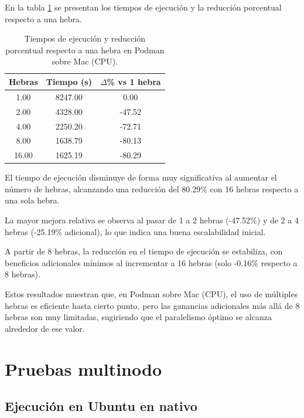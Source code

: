 En la tabla \ref{tab:single-node_mac_podman_time} se presentan los tiempos de ejecución y la reducción porcentual respecto a una hebra.

\begin{table}[ht]
    \centering
    \begin{tabular}{|c|c|c|}
        \hline
        \textbf{Hebras} & \textbf{Tiempo (s)} & \textbf{$\Delta$\% vs 1 hebra} \\
        \hline
        1.00            & 8247.00             & 0.00                           \\
        2.00            & 4328.00             & -47.52                         \\
        4.00            & 2250.20             & -72.71                         \\
        8.00            & 1638.79             & -80.13                         \\
        16.00           & 1625.19             & -80.29                         \\
        \hline
    \end{tabular}
    \caption{Tiempos de ejecución y reducción porcentual respecto a una hebra en Podman sobre Mac (CPU).}
    \label{tab:single-node_mac_podman_time}
\end{table}

El tiempo de ejecución disminuye de forma muy significativa al aumentar el número de hebras, alcanzando una reducción del 80.29\% con 16 hebras respecto a una sola hebra.

La mayor mejora relativa se observa al pasar de 1 a 2 hebras (-47.52\%) y de 2 a 4 hebras (-25.19\% adicional), lo que indica una buena escalabilidad inicial.

A partir de 8 hebras, la reducción en el tiempo de ejecución se estabiliza, con beneficios adicionales mínimos al incrementar a 16 hebras (solo -0.16\% respecto a 8 hebras).

Estos resultados muestran que, en Podman sobre Mac (CPU), el uso de múltiples hebras es eficiente hasta cierto punto, pero las ganancias adicionales más allá de 8 hebras son muy limitadas, sugiriendo que el paralelismo óptimo se alcanza alrededor de ese valor.

\section{Pruebas multinodo}
\subsection{Ejecución en Ubuntu en nativo}
